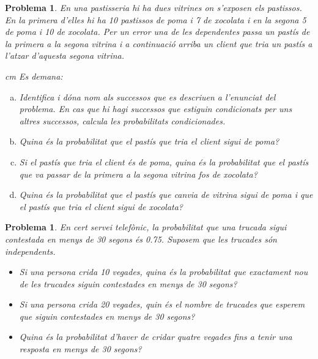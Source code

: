 \documentclass[a4paper,12pt]{article}
\newcounter{prbcont}
\newtheorem{problema}[prbcont]{Problema}
\begin{document}
\begin{problema}
En una pastisseria hi ha dues vitrines on s'exposen els pastissos. En la primera d'elles hi ha 10 pastissos de poma i 7 de xocolata
i en la segona 5 de poma i 10 de xocolata. Per un error una de les dependentes passa un pastís de la primera a la segona vitrina
i a continuació arriba un client que tria un pastís a l'atzar d'aquesta segona vitrina.


 cm
Es demana:

\begin{enumerate}[a)]
\item Identifica i dóna nom als successos que es descriuen a l'enunciat del problema.
En cas que hi hagi successos que estiguin condicionats per uns altres successos, calcula les probabilitats condicionades. 
\item Quina és la probabilitat que el pastís que tria el client sigui de poma?
\item Si el pastís que tria el client és de poma, quina és la probabilitat que el pastís que va passar de la primera a la segona 
vitrina fos de xocolata?
\item Quina és la probabilitat que el pastís que canvia de vitrina sigui de poma i que el pastís que tria el client sigui de xocolata?
\end{enumerate}
\end{problema}


\newpage
\begin{problema}
En cert servei telef\`onic, la probabilitat que una trucada sigui contestada en menys de 30 segons \'es 0.75. Suposem que les trucades s\'on independents.
\begin{itemize}
\item [a)] Si una persona crida 10 vegades, quina \'es la probabilitat que exactament nou de les trucades siguin contestades en menys de 30 segons?
\item [b)] Si una persona crida 20 vegades, quin \'es el nombre de trucades que esperem que siguin contestades en menys de 30 segons?
\item [c)] Quina \'es la probabilitat d'haver de cridar quatre vegades fins a tenir una resposta en menys de 30 segons?
\end{itemize}
\end{problema}
\end{document}
